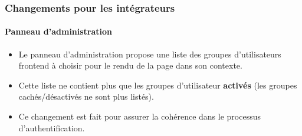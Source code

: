%

\begin{frame}[fragile]
	\frametitle{Changements pour les intégrateurs}
	\framesubtitle{Panneau d'administration}


	\begin{itemize}
		\item Le panneau d'administration propose une liste des groupes d'utilisateurs
			frontend à choisir pour le rendu de la page dans son contexte.
		\item Cette liste ne contient plus que les groupes d'utilisateur \textbf{activés}
			(les groupes cachés/désactivés ne sont plus listés).
		\item Ce changement est fait pour assurer la cohérence dans le processus d'authentification.
	\end{itemize}
\end{frame}

